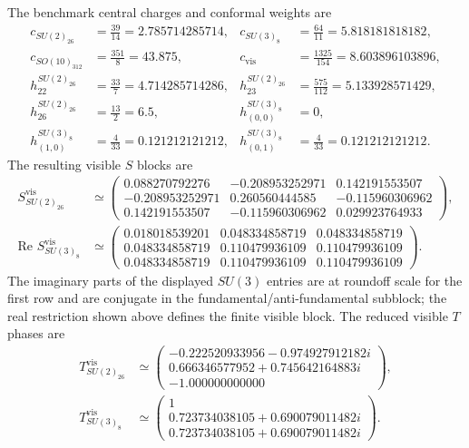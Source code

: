 \documentclass[11pt,letterpaper]{article}
\theoremstyle{plain}
\begin{document}
The benchmark central charges and conformal weights are
\begin{align}
\label{eq:section-three-numerical-central-charges}
c_{SU(2)_{26}}
&=\frac{39}{14}=2.785714285714,
&
c_{SU(3)_8}
&=\frac{64}{11}=5.818181818182,\nonumber\\
c_{SO(10)_{312}}
&=\frac{351}{8}=43.875,
&
c_{\text{vis}}
&=\frac{1325}{154}=8.603896103896,\\
\label{eq:section-three-numerical-weights}
h^{SU(2)_{26}}_{22}
&=\frac{33}{7}=4.714285714286,
&
h^{SU(2)_{26}}_{23}
&=\frac{575}{112}=5.133928571429,\nonumber\\
h^{SU(2)_{26}}_{26}
&=\frac{13}{2}=6.5,
&
h^{SU(3)_8}_{(0,0)}
&=0,\nonumber\\
h^{SU(3)_8}_{(1,0)}
&=\frac{4}{33}=0.121212121212,
&
h^{SU(3)_8}_{(0,1)}
&=\frac{4}{33}=0.121212121212.
\end{align}
The resulting visible $S$ blocks are
\begin{align}
\label{eq:section-three-numerical-s-blocks}
 S_{SU(2)_{26}}^{\text{vis}}
 &\simeq
 \begin{pmatrix}
  0.088270792276 & -0.208953252971 &  0.142191553507\\
 -0.208953252971 &  0.260560444585 & -0.115960306962\\
  0.142191553507 & -0.115960306962 &  0.029923764933
 \end{pmatrix},\nonumber\\
 \text{Re } S_{SU(3)_8}^{\text{vis}}
 &\simeq
 \begin{pmatrix}
 0.018018539201 & 0.048334858719 & 0.048334858719\\
 0.048334858719 & 0.110479936109 & 0.110479936109\\
 0.048334858719 & 0.110479936109 & 0.110479936109
 \end{pmatrix}.
\end{align}
The imaginary parts of the displayed $SU(3)$ entries are at roundoff scale for
the first row and are conjugate in the fundamental/anti-fundamental subblock;
the real restriction shown above defines the finite visible block.  The reduced
visible $T$ phases are
\begin{align}
\label{eq:section-three-numerical-t-phases}
 T_{SU(2)_{26}}^{\text{vis}}
 &\simeq
 \begin{pmatrix}
 -0.222520933956-0.974927912182i\\
 0.666346577952+0.745642164883i\\
 -1.000000000000
 \end{pmatrix},\nonumber\\
 T_{SU(3)_8}^{\text{vis}}
 &\simeq
 \begin{pmatrix}
 1\\
 0.723734038105+0.690079011482i\\
 0.723734038105+0.690079011482i
 \end{pmatrix}.
\end{align}
\end{document}
